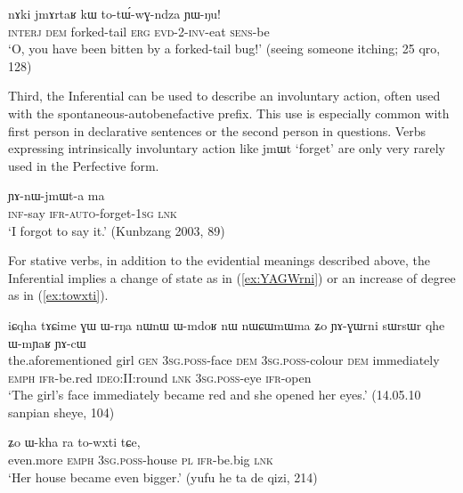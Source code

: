 \documentclass[oldfontcommands,oneside,a4paper,11pt]{article}
\newcommand{\ipa}[1]{{\phon \mbox{#1}}} %
\newcommand{\refb}[1]{(\ref{#1})}
\begin{document}
\begin{exe}
\ex \label{ex:totWwGndza}
\gll \ipa{e}	\ipa{nɤki} \ipa{jmɤrtaʁ} 	\ipa{kɯ} 	\ipa{to-tɯ́-wɣ-ndza} 	\ipa{ɲɯ-ŋu!} \\
\textsc{interj} \textsc{dem} forked-tail \textsc{erg} \textsc{evd-2-inv}-eat \textsc{sens}-be\\
\glt `O, you have been bitten by a forked-tail bug!' (seeing someone itching; 25 qro, 128)
\end{exe}

Third, the Inferential can be used to describe an involuntary action, often used with the spontaneous-autobenefactive prefix. This use is especially common with first person in declarative sentences or the second person in questions. Verbs expressing intrinsically involuntary action like \ipa{jmɯt} `forget' are only very rarely used in the Perfective form.

\begin{exe}
\ex 
\gll \ipa{kɤ-ti} \ipa{ɲɤ-nɯ-jmɯt-a} \ipa{ma} \\
\textsc{inf}-say  \textsc{ifr-auto}-forget-\textsc{1sg} \textsc{lnk}\\
\glt `I forgot to say it.' (Kunbzang 2003, 89)
\end{exe}

For stative verbs, in addition to the evidential meanings described above, the Inferential implies a change of state as in \refb{ex:YAGWrni} or an increase of degree as in \refb{ex:towxti}.

\begin{exe}
\ex \label{ex:YAGWrni}
\gll 
\ipa{iɕqha} 	\ipa{tɤɕime} 	\ipa{ɣɯ} 	\ipa{ɯ-rŋa} 	\ipa{nɯnɯ} 	\ipa{ɯ-mdoʁ} 	\ipa{nɯ} 	\ipa{nɯɕɯmɯma} 	\ipa{ʑo} 	\ipa{ɲɤ-ɣɯrni} 	\ipa{sɯrsɯr} 	\ipa{qhe} 	\ipa{ɯ-mɲaʁ} 	\ipa{ɲɤ-cɯ}\\
the.aforementioned girl \textsc{gen} \textsc{3sg.poss}-face \textsc{dem} \textsc{3sg.poss}-colour \textsc{dem} immediately \textsc{emph} \textsc{ifr}-be.red \textsc{ideo}:II:round \textsc{lnk} \textsc{3sg.poss}-eye \textsc{ifr}-open \\
\glt `The girl's face immediately became red and she opened her eyes.' (14.05.10 sanpian sheye, 104)
\end{exe}

\begin{exe}
\ex \label{ex:towxti}
\gll \ipa{mɤʑɯ} 	\ipa{ʑo} 	\ipa{ɯ-kha} 	\ipa{ra} 	\ipa{to-wxti} 	\ipa{tɕe,} \\
even.more \textsc{emph} \textsc{3sg.poss}-house \textsc{pl} \textsc{ifr}-be.big \textsc{lnk} \\
\glt `Her house became even bigger.' (yufu he ta de qizi, 214)
\end{exe}
\end{document}
